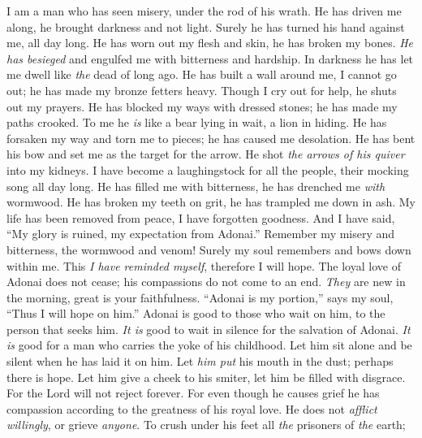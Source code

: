 \begin{biblechapter} %
 I am a man who has seen misery, 
under the rod of his wrath.
\verse He has driven me along, he brought 
darkness and not light.
\verse Surely he has turned his hand against me, 
all day long.
\verse He has worn out my flesh and skin, 
he has broken my bones.
\verse \textit{He has besieged} and engulfed me 
with bitterness and hardship.
\verse In darkness he has let me dwell 
like \textit{the} dead of long ago.
\verse He has built a wall around me, I cannot go out; 
he has made my bronze fetters heavy.
\verse Though I cry out for help, 
he shuts out my prayers.
\verse He has blocked my ways with dressed stones; 
he has made my paths crooked.
\verse To me he \textit{is} like a bear lying in wait, 
a lion in hiding.
\verse He has forsaken my way and torn me to pieces; 
he has caused me desolation.
\verse He has bent his bow and set me 
as the target for the arrow.
\verse He shot \textit{the arrows of his quiver} 
into my kidneys.
\verse I have become a laughingstock for all the people, 
their mocking song all day long.
\verse He has filled me with bitterness, 
he has drenched me \textit{with} wormwood.
\verse He has broken my teeth on grit, 
he has trampled me down in ash.
\verse My life has been removed from peace, 
I have forgotten goodness.
\verse And I have said, “My glory is ruined, 
my expectation from Adonai.”
\verse Remember my misery and bitterness, 
the wormwood and venom!
\verse Surely my soul remembers 
and bows down within me.
\verse This \textit{I have reminded myself}, 
therefore I will hope.
\verse The loyal love of Adonai does not cease; 
his compassions do not come to an end.
\verse \textit{They} are new in the morning, 
great is your faithfulness.
\verse “Adonai is my portion,” 
says my soul, 
“Thus I will hope on him.”
\verse Adonai is good to those who wait on him, 
to the person that seeks him.
\verse \textit{It is} good to wait in silence 
for the salvation of Adonai.
\verse \textit{It is} good for a man who carries 
the yoke of his childhood.
\verse Let him sit alone and be silent 
when he has laid it on him.
\verse Let \textit{him put} his mouth in the dust; 
perhaps there is hope.
\verse Let him give a cheek to his smiter, 
let him be filled with disgrace.
\verse For the Lord will not reject 
forever.
\verse For even though he causes grief he has compassion 
according to the greatness of his royal love.
\verse He does not \textit{afflict willingly}, 
or grieve \textit{anyone}.
\verse To crush under his feet 
all \textit{the} prisoners of \textit{the} earth;

\end{biblechapter}
